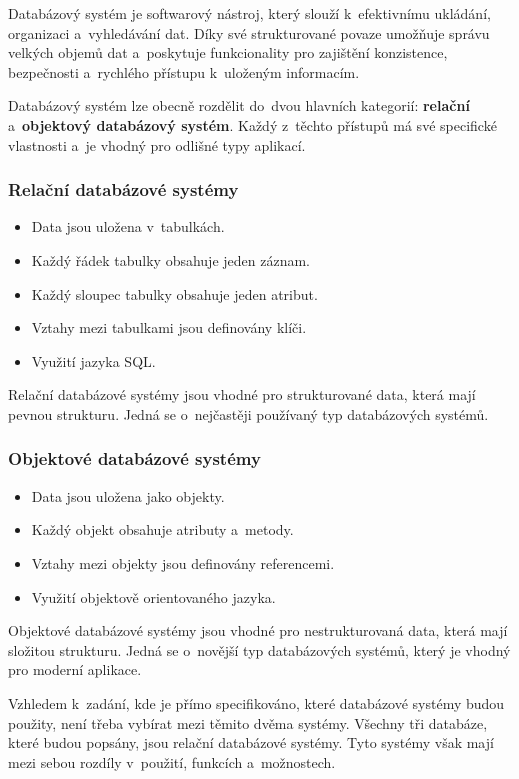 Databázový systém je softwarový nástroj, který slouží k~efektivnímu ukládání, organizaci a~vyhledávání dat.
Díky své strukturované povaze umožňuje správu velkých objemů dat a~poskytuje funkcionality pro
zajištění konzistence, bezpečnosti a~rychlého přístupu k~uloženým informacím.

Databázový systém lze obecně rozdělit do~dvou hlavních kategorií: \textbf{relační} a~\textbf{objektový databázový systém}.
Každý z~těchto přístupů má své specifické vlastnosti a~je vhodný pro odlišné typy aplikací.

\subsubsection*{Relační databázové systémy}
\begin{itemize}[itemsep=-1pt]
    \item Data jsou uložena v~tabulkách.
    \item Každý řádek tabulky obsahuje jeden záznam.
    \item Každý sloupec tabulky obsahuje jeden atribut.
    \item Vztahy mezi tabulkami jsou definovány klíči.
    \item Využití jazyka SQL.
\end{itemize}
Relační databázové systémy jsou vhodné pro strukturované data, která mají pevnou strukturu.
Jedná se o~nejčastěji používaný typ databázových systémů.

\subsubsection*{Objektové databázové systémy}
\begin{itemize}[itemsep=-1pt]
    \item Data jsou uložena jako objekty.
    \item Každý objekt obsahuje atributy a~metody.
    \item Vztahy mezi objekty jsou definovány referencemi.
    \item Využití objektově orientovaného jazyka.
\end{itemize}
Objektové databázové systémy jsou vhodné pro nestrukturovaná data, která mají složitou strukturu.
Jedná se o~novější typ databázových systémů, který je vhodný pro moderní aplikace.

Vzhledem k~zadání, kde je přímo specifikováno, které databázové systémy budou použity,
není třeba vybírat mezi těmito dvěma systémy. Všechny tři databáze, které budou popsány,
jsou relační databázové systémy. Tyto systémy však mají mezi sebou rozdíly v~použití, funkcích a~možnostech.

